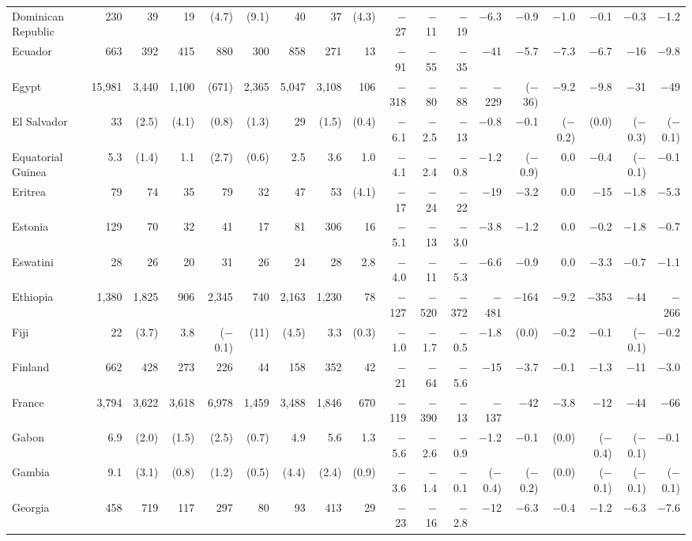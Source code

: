 \begin{longtable}{lrrrrrrrrrrrrrrrrr}
Dominican Republic & 230 & 39 & 19 & (4.7) & (9.1) & 40 & 37 & (4.3) & $-$27 & $-$11 & $-$19 & $-$6.3 & $-$0.9 & $-$1.0 & $-$0.1 & $-$0.3 & $-$1.2 \\
Ecuador & 663 & 392 & 415 & 880 & 300 & 858 & 271 & 13 & $-$91 & $-$55 & $-$35 & $-$41 & $-$5.7 & $-$7.3 & $-$6.7 & $-$16 & $-$9.8 \\
Egypt & 15,981 & 3,440 & 1,100 & (671) & 2,365 & 5,047 & 3,108 & 106 & $-$318 & $-$80 & $-$88 & $-$229 & ($-$36) & $-$9.2 & $-$9.8 & $-$31 & $-$49 \\
El Salvador & 33 & (2.5) & (4.1) & (0.8) & (1.3) & 29 & (1.5) & (0.4) & $-$6.1 & $-$2.5 & $-$13 & $-$0.8 & $-$0.1 & ($-$0.2) & (0.0) & ($-$0.3) & ($-$0.1) \\
Equatorial Guinea & 5.3 & (1.4) & 1.1 & (2.7) & (0.6) & 2.5 & 3.6 & 1.0 & $-$4.1 & $-$2.4 & $-$0.8 & $-$1.2 & ($-$0.9) & 0.0 & $-$0.4 & ($-$0.1) & $-$0.1 \\
Eritrea & 79 & 74 & 35 & 79 & 32 & 47 & 53 & (4.1) & $-$17 & $-$24 & $-$22 & $-$19 & $-$3.2 & 0.0 & $-$15 & $-$1.8 & $-$5.3 \\
Estonia & 129 & 70 & 32 & 41 & 17 & 81 & 306 & 16 & $-$5.1 & $-$13 & $-$3.0 & $-$3.8 & $-$1.2 & 0.0 & $-$0.2 & $-$1.8 & $-$0.7 \\
Eswatini & 28 & 26 & 20 & 31 & 26 & 24 & 28 & 2.8 & $-$4.0 & $-$11 & $-$5.3 & $-$6.6 & $-$0.9 & 0.0 & $-$3.3 & $-$0.7 & $-$1.1 \\
Ethiopia & 1,380 & 1,825 & 906 & 2,345 & 740 & 2,163 & 1,230 & 78 & $-$127 & $-$520 & $-$372 & $-$481 & $-$164 & $-$9.2 & $-$353 & $-$44 & $-$266 \\
Fiji & 22 & (3.7) & 3.8 & ($-$0.1) & (11) & (4.5) & 3.3 & (0.3) & $-$1.0 & $-$1.7 & $-$0.5 & $-$1.8 & (0.0) & $-$0.2 & $-$0.1 & ($-$0.1) & $-$0.2 \\
Finland & 662 & 428 & 273 & 226 & 44 & 158 & 352 & 42 & $-$21 & $-$64 & $-$5.6 & $-$15 & $-$3.7 & $-$0.1 & $-$1.3 & $-$11 & $-$3.0 \\
France & 3,794 & 3,622 & 3,618 & 6,978 & 1,459 & 3,488 & 1,846 & 670 & $-$119 & $-$390 & $-$13 & $-$137 & $-$42 & $-$3.8 & $-$12 & $-$44 & $-$66 \\
Gabon & 6.9 & (2.0) & (1.5) & (2.5) & (0.7) & 4.9 & 5.6 & 1.3 & $-$5.6 & $-$2.6 & $-$0.9 & $-$1.2 & $-$0.1 & (0.0) & ($-$0.4) & ($-$0.1) & $-$0.1 \\
Gambia & 9.1 & (3.1) & (0.8) & (1.2) & (0.5) & (4.4) & (2.4) & (0.9) & $-$3.6 & $-$1.4 & $-$0.1 & ($-$0.4) & ($-$0.2) & (0.0) & ($-$0.1) & ($-$0.1) & ($-$0.1) \\
Georgia & 458 & 719 & 117 & 297 & 80 & 93 & 413 & 29 & $-$23 & $-$16 & $-$2.8 & $-$12 & $-$6.3 & $-$0.4 & $-$1.2 & $-$6.3 & $-$7.6 \\

\end{longtable}
